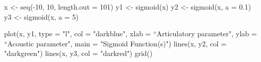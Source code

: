 \documentclass{article}
\begin{document}


x <- seq(-10, 10, length.out = 101)
y1 <- sigmoid(x)
y2 <- sigmoid(x, a = 0.1)
y3 <- sigmoid(x, a = 5)

plot(x, y1, type = "l", col = "darkblue", 
     xlab = ``Articulatory parameter", ylab = ``Acoustic parameter", main = "Sigmoid Function(s)")
lines(x, y2, col = "darkgreen")
lines(x, y3, col = "darkred")
grid()
\end{document}
